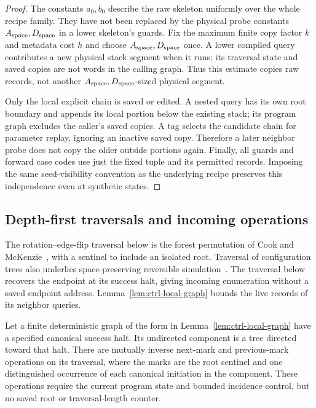 \begin{proof}
The constants $a_0,b_0$ describe the raw skeleton uniformly over the
whole recipe family.  They have not been replaced by the physical probe
constants $A_{\rm space},D_{\rm space}$ in a lower skeleton's guards.  Fix the maximum finite
copy factor $k$ and metadata cost $h$ and choose $A_{\rm space},D_{\rm space}$ once.  A lower
compiled query contributes a new physical stack segment when it runs;
its traversal state and saved copies are not words in the calling graph.
Thus this estimate copies raw records, not another $A_{\rm space},D_{\rm space}$-sized physical
segment.

Only the local explicit chain is saved or edited.  A nested query has
its own root boundary and appends its local portion below the existing
stack; its program graph excludes the caller's saved copies.  A tag
selects the candidate chain for parameter replay, ignoring an inactive
saved copy.  Therefore a later neighbor probe does not copy the older
outside portions again.  Finally, all guards and forward case codes
use just the fixed tuple and its permitted records.  Imposing the same
seed-visibility convention as the underlying recipe preserves this
independence even at synthetic states.
\end{proof}

\subsection{Depth-first traversals and incoming operations}\label{sec:ctrl-incoming}

The rotation--edge-flip traversal below is the forest permutation
of Cook and McKenzie~\cite[Proposition~1, p.~387]{CookMcKenzie1987},
with a sentinel to include an isolated root. Traversal of configuration
trees also underlies space-preserving reversible simulation~\cite{LMT2000}.
The traversal below recovers the endpoint at its success halt, giving
incoming enumeration without a saved endpoint address.
Lemma~\ref{lem:ctrl-local-graph} bounds the live records of its neighbor
queries.

\begin{lemma}\label{lem:ctrl-tour}
Let a finite deterministic graph of the form in
Lemma~\ref{lem:ctrl-local-graph} have a specified canonical success halt.
Its undirected component is a tree directed toward that halt.  There
are mutually inverse next-mark and previous-mark operations on its
traversal, where the marks are the root sentinel and one distinguished
occurrence of each canonical initiation in the component.  These
operations require the current program state and bounded incidence
control, but no saved root or traversal-length counter.
\end{lemma}

